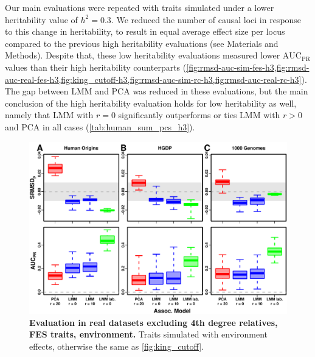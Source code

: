 \documentclass[11pt]{article}
\newcommand{\auc}{\text{AUC}_\text{PR}}
\begin{document}
\begin{linenumbers}
Our main evaluations were repeated with traits simulated under a lower heritability value of $h^2 = 0.3$.
We reduced the number of causal loci in response to this change in heritability, to result in equal average effect size per locus compared to the previous high heritability evaluations (see Materials and Methods).
Despite that, these low heritability evaluations measured lower $\auc$ values than their high heritability counterparts (\cref{fig:rmsd-auc-sim-fes-h3,fig:rmsd-auc-real-fes-h3,fig:king_cutoff-h3,fig:rmsd-auc-sim-rc-h3,fig:rmsd-auc-real-rc-h3}).
The gap between LMM and PCA was reduced in these evaluations, but the main conclusion of the high heritability evaluation holds for low heritability as well, namely that LMM with $r=0$ significantly outperforms or ties LMM with $r > 0$ and PCA in all cases (\cref{tab:human_sum_pcs_h3}).

\begin{figure}[hp]
  \centering
  \includegraphics[width=\textwidth]{fes/m_causal_fac-27/h0.3/env0.3-0.2/rmsd-auc_king-cutoff-4.pdf}
  \caption{
    {\bf Evaluation in real datasets excluding 4th degree relatives, FES traits, environment.}
    Traits simulated with environment effects, otherwise the same as \cref{fig:king_cutoff}.
  }
  \label{fig:king_cutoff-env}
\end{figure}


\end{linenumbers}
\end{document}

